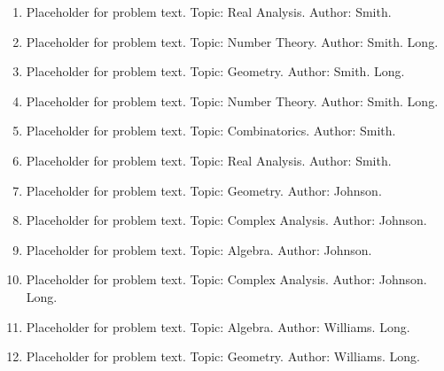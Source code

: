 \documentclass[12pt]{article}
\newcommand{\answer}[1]{} %
\newcommand{\topic}[1]{} %
\renewcommand{\author}[1]{} %
\newcommand{\isLong}[1]{} %
\begin{document}
\begin{enumerate}
\item Placeholder for problem text. Topic: Real Analysis. Author: Smith. 
\answer{Answer here}
\topic{Real Analysis}
\author{Smith}
\isLong{false}

\item Placeholder for problem text. Topic: Number Theory. Author: Smith. Long.
\answer{Answer here}
\topic{Number Theory}
\author{Smith}
\isLong{true}

\item Placeholder for problem text. Topic: Geometry. Author: Smith. Long.
\answer{Answer here}
\topic{Geometry}
\author{Smith}
\isLong{true}

\item Placeholder for problem text. Topic: Number Theory. Author: Smith. Long.
\answer{Answer here}
\topic{Number Theory}
\author{Smith}
\isLong{true}

\item Placeholder for problem text. Topic: Combinatorics. Author: Smith. 
\answer{Answer here}
\topic{Combinatorics}
\author{Smith}
\isLong{false}

\item Placeholder for problem text. Topic: Real Analysis. Author: Smith. 
\answer{Answer here}
\topic{Real Analysis}
\author{Smith}
\isLong{false}

\item Placeholder for problem text. Topic: Geometry. Author: Johnson. 
\answer{Answer here}
\topic{Geometry}
\author{Johnson}
\isLong{false}

\item Placeholder for problem text. Topic: Complex Analysis. Author: Johnson. 
\answer{Answer here}
\topic{Complex Analysis}
\author{Johnson}
\isLong{false}

\item Placeholder for problem text. Topic: Algebra. Author: Johnson. 
\answer{Answer here}
\topic{Algebra}
\author{Johnson}
\isLong{false}

\item Placeholder for problem text. Topic: Complex Analysis. Author: Johnson. Long.
\answer{Answer here}
\topic{Complex Analysis}
\author{Johnson}
\isLong{true}

\item Placeholder for problem text. Topic: Algebra. Author: Williams. Long.
\answer{Answer here}
\topic{Algebra}
\author{Williams}
\isLong{true}

\item Placeholder for problem text. Topic: Geometry. Author: Williams. Long.
\answer{Answer here}
\topic{Geometry}
\author{Williams}
\isLong{true}


\end{enumerate}
\end{document}
